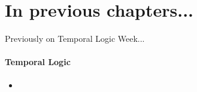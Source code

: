 
\section{In previous chapters...}
\begin{frame}{Previously on Temporal Logic Week...}
  \framesubtitle{Temporal Logic}
  \begin{itemize}
	\item
  \end{itemize}

\end{frame}